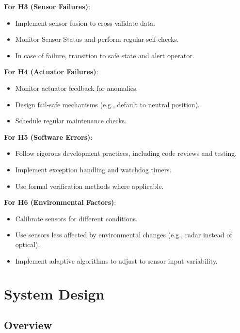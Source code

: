 \documentclass[12pt]{article}
\begin{document}
\textbf{For H3 (Sensor Failures)}:

\begin{itemize}
    \item Implement sensor fusion to cross-validate data.
    \item Monitor Sensor Status and perform regular self-checks.
    \item In case of failure, transition to safe state and alert operator.
\end{itemize}

\textbf{For H4 (Actuator Failures)}:

\begin{itemize}
    \item Monitor actuator feedback for anomalies.
    \item Design fail-safe mechanisms (e.g., default to neutral position).
    \item Schedule regular maintenance checks.
\end{itemize}

\textbf{For H5 (Software Errors)}:

\begin{itemize}
    \item Follow rigorous development practices, including code reviews and testing.
    \item Implement exception handling and watchdog timers.
    \item Use formal verification methods where applicable.
\end{itemize}

\textbf{For H6 (Environmental Factors)}:

\begin{itemize}
    \item Calibrate sensors for different conditions.
    \item Use sensors less affected by environmental changes (e.g., radar instead of optical).
    \item Implement adaptive algorithms to adjust to sensor input variability.
\end{itemize}

\section{System Design}

\subsection{Overview}
\end{document}

